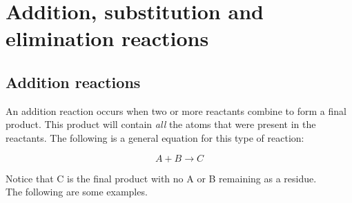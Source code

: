 



\section{Addition, substitution and elimination reactions}

\subsection{Addition reactions}

An addition reaction occurs when two or more reactants combine to form a final product. This product will contain \textit{all} the atoms that were present in the reactants. The following is a general equation for this type of reaction:

\begin{equation*}
A + B \rightarrow C
\end{equation*}

Notice that C is the final product with no A or B remaining as a residue.\\

The following are some examples.

